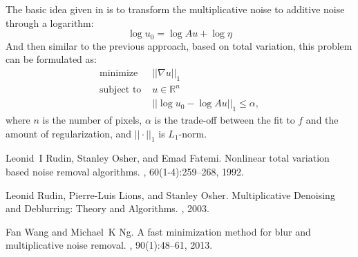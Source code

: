\documentclass[11pt, oneside]{article}   	%
\begin{document}
The basic idea given in \cite{wang2013fast} is to transform the multiplicative
noise to additive noise through a logarithm:
$$\log u_0 = \log Au + \log \eta$$
And then similar to the previous approach, based on total variation, this
problem can be formulated as:
\begin{align}
  \text{minimize } & ||\nabla u||_1 \\
  \text{subject to } & u \in \mathbb{R}^n \\
                    & || \log u_0 - \log Au ||_1 \leq \alpha,
\end{align}
where $n$ is the number of pixels, $\alpha$ is the trade-off between the fit to
$f$ and the amount of regularization, and $||\cdot||_1$ is $L_1$-norm.


\nocite{*}
\begin{thebibliography}{3}

Leonid~I Rudin, Stanley Osher, and Emad Fatemi.
\newblock Nonlinear total variation based noise removal algorithms.
, 60(1-4):259--268, 1992.

Leonid Rudin, Pierre-Luis Lions, and Stanley Osher.
\newblock Multiplicative Denoising and Deblurring: Theory and Algorithms.
, 2003.

Fan Wang and Michael~K Ng.
\newblock A fast minimization method for blur and multiplicative noise removal.
, 90(1):48--61,
  2013.

\end{thebibliography}
\end{document}
